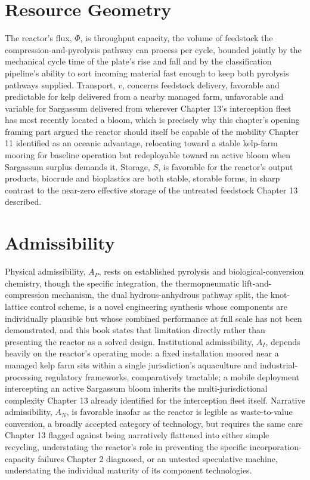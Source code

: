 \documentclass[11pt,oneside]{book}
\begin{document}
\section*{Resource Geometry}

The reactor's flux, $\Phi$, is throughput capacity, the volume of feedstock the compression-and-pyrolysis pathway can process per cycle, bounded jointly by the mechanical cycle time of the plate's rise and fall and by the classification pipeline's ability to sort incoming material fast enough to keep both pyrolysis pathways supplied. Transport, $v$, concerns feedstock delivery, favorable and predictable for kelp delivered from a nearby managed farm, unfavorable and variable for Sargassum delivered from wherever Chapter 13's interception fleet has most recently located a bloom, which is precisely why this chapter's opening framing part argued the reactor should itself be capable of the mobility Chapter 11 identified as an oceanic advantage, relocating toward a stable kelp-farm mooring for baseline operation but redeployable toward an active bloom when Sargassum surplus demands it. Storage, $S$, is favorable for the reactor's output products, biocrude and bioplastics are both stable, storable forms, in sharp contrast to the near-zero effective storage of the untreated feedstock Chapter 13 described.

\section*{Admissibility}

Physical admissibility, $A_P$, rests on established pyrolysis and biological-conversion chemistry, though the specific integration, the thermopneumatic lift-and-compression mechanism, the dual hydrous-anhydrous pathway split, the knot-lattice control scheme, is a novel engineering synthesis whose components are individually plausible but whose combined performance at full scale has not been demonstrated, and this book states that limitation directly rather than presenting the reactor as a solved design. Institutional admissibility, $A_I$, depends heavily on the reactor's operating mode: a fixed installation moored near a managed kelp farm sits within a single jurisdiction's aquaculture and industrial-processing regulatory frameworks, comparatively tractable; a mobile deployment intercepting an active Sargassum bloom inherits the multi-jurisdictional complexity Chapter 13 already identified for the interception fleet itself. Narrative admissibility, $A_N$, is favorable insofar as the reactor is legible as waste-to-value conversion, a broadly accepted category of technology, but requires the same care Chapter 13 flagged against being narratively flattened into either simple recycling, understating the reactor's role in preventing the specific incorporation-capacity failures Chapter 2 diagnosed, or an untested speculative machine, understating the individual maturity of its component technologies.
\end{document}
